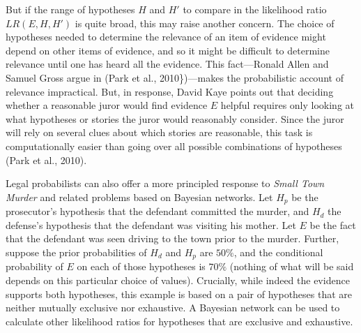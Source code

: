 \documentclass[10pt,dvipsnames,enabledeprecatedfontcommands]{scrartcl}
\begin{document}
But if the range of hypotheses \(H\) and \(H'\) to compare in the
likelihood ratio \(LR(E, H, H')\) is quite broad, this may raise another
concern. The choice of hypotheses needed to determine the relevance of
an item of evidence might depend on other items of evidence, and so it
might be difficult to determine relevance until one has heard all the
evidence. This fact---Ronald Allen and Samuel Gross argue in (Park et
al., 2010\})---makes the probabilistic account of relevance impractical.
But, in response, David Kaye points out that deciding whether a
reasonable juror would find evidence \(E\) helpful requires only looking
at what hypotheses or stories the juror would reasonably consider. Since
the juror will rely on several clues about which stories are reasonable,
this task is computationally easier than going over all possible
combinations of hypotheses (Park et al., 2010).

Legal probabilists can also offer a more principled response to
\emph{Small Town Murder} and related problems based on Bayesian
networks. Let \(H_p\) be the prosecutor's hypothesis that the defendant
committed the murder, and \(H_d\) the defense's hypothesis that the
defendant was visiting his mother. Let \(E\) be the fact that the
defendant was seen driving to the town prior to the murder. Further,
suppose the prior probabilities of \(H_d\) and \(H_p\) are \(50\%\), and
the conditional probability of \(E\) on each of those hypotheses is
\(70\%\) (nothing of what will be said depends on this particular choice
of values). Crucially, while indeed the evidence supports both
hypotheses, this example is based on a pair of hypotheses that are
neither mutually exclusive nor exhaustive. A Bayesian network can be
used to calculate other likelihood ratios for hypotheses that are
exclusive and exhaustive.
\end{document}
